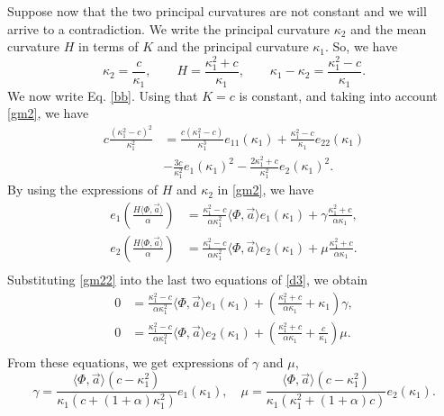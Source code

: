 \documentclass{birkjour}
\theoremstyle{definition}
\theoremstyle{remark}
\numberwithin{equation}{section}
\begin{document}
Suppose now that the two principal curvatures are not constant and we will arrive to a contradiction.  We write the principal curvature $\kappa_2$ and the mean curvature   $H$ in terms of $K$ and the principal curvature  $\kappa_1$. So, we have  
\begin{equation}\label{gm2}
\kappa_2 =\frac{c}{\kappa_1},\qquad H =\frac{\kappa_1^2+c}{\kappa_1},\qquad 
\kappa_1-\kappa_2=\frac{\kappa_1^2-c}{\kappa_1}.
\end{equation}
We now write Eq. \eqref{bb}. Using that $K=c$ is constant, and taking into account \eqref{gm2}, we have  
 \begin{equation}\label{bb2}
  \begin{split}
    c\frac{(\kappa_1^2-c)^2}{\kappa_1^2}&=\frac{c(\kappa_1^2-c)}{\kappa_1^3}e_{11}(\kappa_1) +\frac{\kappa_1^2-c}{\kappa_1}e_{22}(\kappa_1)\\
   &-\frac{3c}{\kappa_1^2}e_1(\kappa_1)^2-\frac{2\kappa_1^2+c}{\kappa_1^2}e_2(\kappa_1)^2.
   \end{split}
\end{equation}
By using the expressions of $H$ and $\kappa_2$ in \eqref{gm2},  we have
\begin{equation}\label{gm22}
\begin{split}
e_1(\frac{H\langle\Phi,\vec{a}\rangle}{\alpha})&= \frac{\kappa_1^2-c}{\alpha\kappa_1^2}\langle\Phi,\vec{a}\rangle e_1(\kappa_1)+\gamma\frac{\kappa_1^2+c}{\alpha \kappa_1},\\
e_2(\frac{H\langle\Phi,\vec{a}\rangle}{\alpha})&= \frac{\kappa_1^2-c}{\alpha\kappa_1^2}\langle\Phi,\vec{a}\rangle e_2(\kappa_1)+\mu\frac{\kappa_1^2+c}{\alpha \kappa_1}.\\
\end{split}
\end{equation}
Substituting \eqref{gm22} into  the last two equations of \eqref{d3},   we obtain
\begin{equation*}
\begin{split}
 0&=\frac{\kappa_1^2-c}{\alpha\kappa_1^2}\langle\Phi,\vec{a}\rangle e_1(\kappa_1)+\left(\frac{\kappa_1^2+c}{\alpha \kappa_1} +\kappa_1\right)\gamma,\\
0 &= \frac{\kappa_1^2-c}{\alpha\kappa_1^2}\langle\Phi,\vec{a}\rangle e_2(\kappa_1)+\left(\frac{\kappa_1^2+c}{\alpha \kappa_1}+\frac{c}{\kappa_1}\right)\mu.\\
\end{split}
\end{equation*}
From these equations, we get expressions of $\gamma$ and $\mu$,
\begin{equation}\label{gm}
 \gamma=\frac{\langle\Phi,\vec{a}\rangle(c-\kappa_1^2)}{\kappa_1  (c+(1+\alpha)\kappa_1^2)}e_1(\kappa_1),\quad 
\mu=\frac{\langle\Phi,\vec{a}\rangle(c-\kappa_1^2 )}{ \kappa_1 (\kappa_1^2+(1+\alpha)c)}e_2(\kappa_1).
\end{equation}
 
\end{document}
